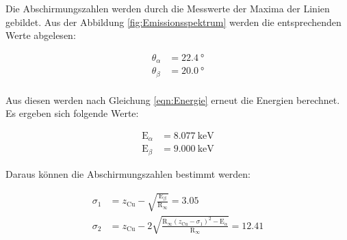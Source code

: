 Die Abschirmungszahlen werden durch die Messwerte der Maxima der Linien gebildet.
Aus der Abbildung \ref{fig:Emissionsspektrum} werden die entsprechenden Werte abgelesen:

\begin{align*}
  \theta_{\alpha} &= \SI{22.4}{\degree} \\
  \theta_{\beta} &= \SI{20.0}{\degree} \\
\end{align*}

Aus diesen werden nach Gleichung \eqref{eqn:Energie} erneut die Energien berechnet.
Es ergeben sich folgende Werte:

\begin{align*}
  \text{E}_{\alpha} &= \SI{8.077}{\kilo\electronvolt} \\
  \text{E}_{\beta} &= \SI{9.000}{\kilo\electronvolt}
\end{align*}

Daraus können die Abschirmungszahlen bestimmt werden:

\begin{align*}
  \sigma_1 &= z_\text{Cu} - \sqrt{\frac{\text{E}_{\beta}}{\text{R}_{\infty}}} = 3.05\\
  \sigma_2 &= z_\text{Cu} - 2\sqrt{\frac{\text{R}_{\infty} \left(z_\text{Cu} - \sigma_1 \right)^2 - \text{E}_{\alpha}}{\text{R}_{\infty}}} = 12.41
\end{align*}

\newpage
